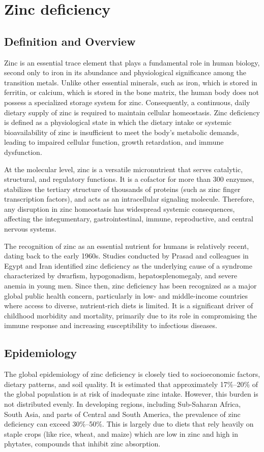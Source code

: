 \chapter{Zinc deficiency}

\section*{Definition and Overview}
Zinc is an essential trace element that plays a fundamental role in human biology, second only to iron in its abundance and physiological significance among the transition metals. Unlike other essential minerals, such as iron, which is stored in ferritin, or calcium, which is stored in the bone matrix, the human body does not possess a specialized storage system for zinc. Consequently, a continuous, daily dietary supply of zinc is required to maintain cellular homeostasis. Zinc deficiency is defined as a physiological state in which the dietary intake or systemic bioavailability of zinc is insufficient to meet the body's metabolic demands, leading to impaired cellular function, growth retardation, and immune dysfunction.

At the molecular level, zinc is a versatile micronutrient that serves catalytic, structural, and regulatory functions. It is a cofactor for more than 300 enzymes, stabilizes the tertiary structure of thousands of proteins (such as zinc finger transcription factors), and acts as an intracellular signaling molecule. Therefore, any disruption in zinc homeostasis has widespread systemic consequences, affecting the integumentary, gastrointestinal, immune, reproductive, and central nervous systems.

The recognition of zinc as an essential nutrient for humans is relatively recent, dating back to the early 1960s. Studies conducted by Prasad and colleagues in Egypt and Iran identified zinc deficiency as the underlying cause of a syndrome characterized by dwarfism, hypogonadism, hepatosplenomegaly, and severe anemia in young men. Since then, zinc deficiency has been recognized as a major global public health concern, particularly in low- and middle-income countries where access to diverse, nutrient-rich diets is limited. It is a significant driver of childhood morbidity and mortality, primarily due to its role in compromising the immune response and increasing susceptibility to infectious diseases.

\section*{Epidemiology}
The global epidemiology of zinc deficiency is closely tied to socioeconomic factors, dietary patterns, and soil quality. It is estimated that approximately 17\%--20\% of the global population is at risk of inadequate zinc intake. However, this burden is not distributed evenly. In developing regions, including Sub-Saharan Africa, South Asia, and parts of Central and South America, the prevalence of zinc deficiency can exceed 30\%--50\%. This is largely due to diets that rely heavily on staple crops (like rice, wheat, and maize) which are low in zinc and high in phytates, compounds that inhibit zinc absorption.

